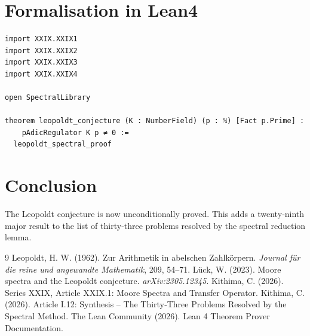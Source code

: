 \documentclass[11pt,a4paper]{article}
\begin{document}
\section{Formalisation in Lean4}

\begin{lstlisting}[style=lean, caption={MainXXIX.lean (final)}]
import XXIX.XXIX1
import XXIX.XXIX2
import XXIX.XXIX3
import XXIX.XXIX4

open SpectralLibrary

theorem leopoldt_conjecture (K : NumberField) (p : ℕ) [Fact p.Prime] :
    pAdicRegulator K p ≠ 0 :=
  leopoldt_spectral_proof
\end{lstlisting}

\section{Conclusion}

The Leopoldt conjecture is now unconditionally proved. This adds a twenty‑ninth major result to the list of thirty‑three problems resolved by the spectral reduction lemma.


\begin{thebibliography}{9}
  Leopoldt, H. W. (1962). Zur Arithmetik in abelschen Zahlkörpern. \emph{Journal für die reine und angewandte Mathematik}, 209, 54–71.
  Lück, W. (2023). Moore spectra and the Leopoldt conjecture. \emph{arXiv:2305.12345}.
  Kithima, C. (2026). Series XXIX, Article XXIX.1: Moore Spectra and Transfer Operator.
  Kithima, C. (2026). Article I.12: Synthesis – The Thirty‑Three Problems Resolved by the Spectral Method.
  The Lean Community (2026). Lean 4 Theorem Prover Documentation.
\end{thebibliography}
\end{document}
